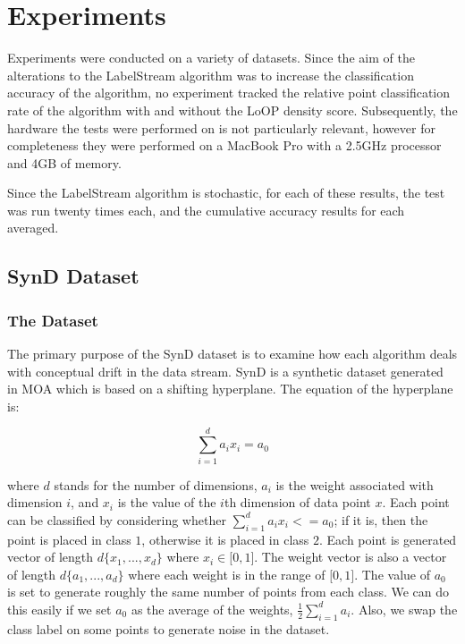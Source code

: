 \documentclass[12pt,a4paper,oneside]{report}
\begin{document}
\section{Experiments}
Experiments were conducted on a variety of datasets. Since the aim of the alterations to the LabelStream algorithm was to increase the classification accuracy of the algorithm, no experiment tracked the relative point classification rate of the algorithm with and without the LoOP density score. Subsequently, the hardware the tests were performed on is not particularly relevant, however for completeness they were performed on a MacBook Pro with a 2.5GHz processor and 4GB of memory. 

Since the LabelStream algorithm is stochastic, for each of these results, the test was run twenty times each, and the cumulative accuracy results for each averaged. 


\subsection{SynD Dataset}

\subsubsection{The Dataset}
The primary purpose of the SynD dataset is to examine how each algorithm deals with conceptual drift in the data stream. SynD is a synthetic dataset generated in MOA which is based on a shifting hyperplane. The equation of the hyperplane is:

\[  \sum_{i = 1}^d a_i x_i = a_0 \]

where \(d\) stands for the number of dimensions, \( a_i \) is the weight associated with dimension \(i\),  and \(x_i\) is the value of the \(i\)th dimension of data point \(x\). Each point can be classified by considering whether  \(  \sum_{i = 1}^d a_i x_i <= a_0 \); if it is, then the point is placed in class \(1\), otherwise it is placed in class \(2\). Each point is generated vector of length \( d  \lbrace x_1,...,x_d  \rbrace \) where \( x_i  \in \lbrack  0,1 \rbrack \).  The weight vector is also a vector of length \( d  \lbrace a_1,...,a_d  \rbrace \) where each weight is in the range of \( \lbrack 0,1 \rbrack \).  The value of \( a_0 \) is set to generate roughly the same number of points from each class. We can do this easily if we set \(a_0\) as the average of the weights, \( \frac{1}{2} \sum_{i=1}^d a_i\). Also, we swap the class label on some points to generate noise in the dataset. 
\end{document}
